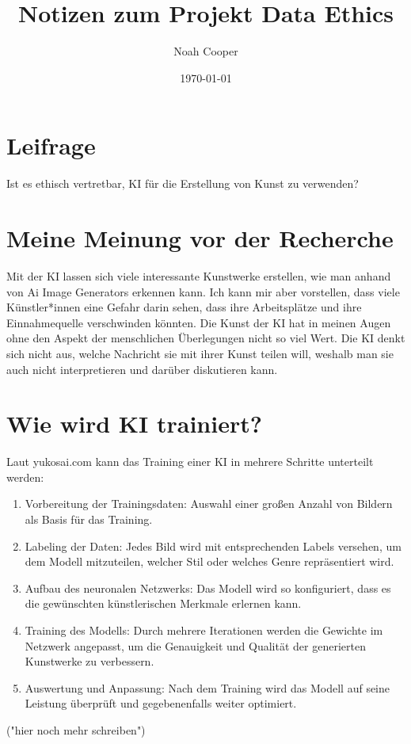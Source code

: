 \documentclass{article}
\title{Notizen zum Projekt Data Ethics}
\author{Noah Cooper}
\date{\today}
\begin{document}
\maketitle


\tableofcontents

\section{Leifrage}
    Ist es ethisch vertretbar, KI für die Erstellung von Kunst zu verwenden?

\section{Meine Meinung vor der Recherche}
    Mit der KI lassen sich viele interessante Kunstwerke erstellen, wie man anhand von Ai Image 
    Generators erkennen kann. Ich kann mir aber vorstellen, dass viele Künstler*innen eine Gefahr 
    darin sehen, dass ihre Arbeitsplätze und ihre Einnahmequelle verschwinden könnten. Die Kunst der KI 
    hat in meinen Augen ohne den Aspekt der menschlichen Überlegungen nicht so viel Wert. Die KI denkt 
    sich nicht aus, welche Nachricht sie mit ihrer Kunst teilen will, weshalb man sie auch nicht 
    interpretieren und darüber diskutieren kann.

\section{Wie wird KI trainiert?}
    Laut yukosai.com kann das Training einer KI in mehrere Schritte unterteilt werden:
    \begin{enumerate}
        \item Vorbereitung der Trainingsdaten: Auswahl einer großen Anzahl von Bildern als Basis für das Training.
        \item Labeling der Daten: Jedes Bild wird mit entsprechenden Labels versehen, um dem Modell mitzuteilen, welcher Stil oder welches Genre repräsentiert wird.
        \item Aufbau des neuronalen Netzwerks: Das Modell wird so konfiguriert, dass es die gewünschten künstlerischen Merkmale erlernen kann.
        \item Training des Modells: Durch mehrere Iterationen werden die Gewichte im Netzwerk angepasst, um die Genauigkeit und Qualität der generierten Kunstwerke zu verbessern.
        \item Auswertung und Anpassung: Nach dem Training wird das Modell auf seine Leistung überprüft und gegebenenfalls weiter optimiert.
    \end{enumerate}
    ("hier noch mehr schreiben")
\end{document}
